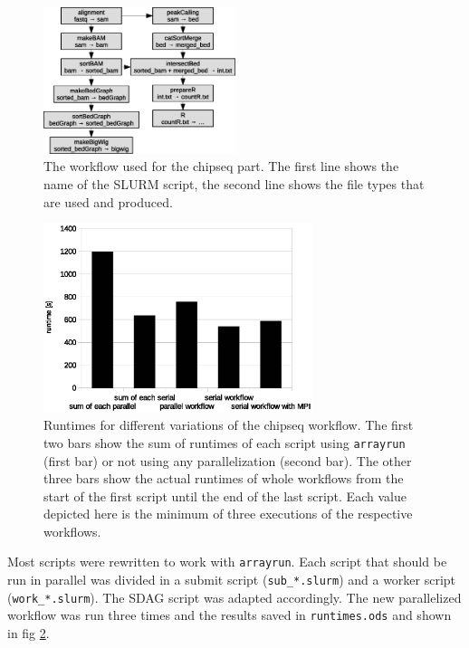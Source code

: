 \documentclass[paper=a4, 12pt]{scrartcl}
\begin{document}
\begin{figure}[ht]
	\centering
		\includegraphics[width=0.5\textwidth]{chipseq-workflow}
	\caption{The workflow used for the chipseq part. The first line shows the name of the SLURM script, the second line shows the file types that are used and produced.}
	\label{fig:chipseq-workflow}
\end{figure}

\begin{figure}[ht]
	\centering
		\includegraphics[width=0.7\textwidth]{chipseq-runtimes}
	\caption{Runtimes for different variations of the chipseq workflow. The first two bars show the sum of runtimes of each script using \texttt{arrayrun} (first bar) or not using any parallelization (second bar). The other three bars show the actual runtimes of whole workflows from the start of the first script until the end of the last script. Each value depicted here is the minimum of three executions of the respective workflows.}
	\label{fig:chipseq-runtimes}
\end{figure}

Most scripts were rewritten to work with \texttt{arrayrun}. Each script that should be run in parallel was divided in a submit script (\texttt{sub\_*.slurm}) and a worker script (\texttt{work\_*.slurm}). The SDAG script was adapted accordingly. The new parallelized workflow was run three times and the results saved in \texttt{runtimes.ods} and shown in fig \ref{fig:chipseq-runtimes}.
\end{document}
